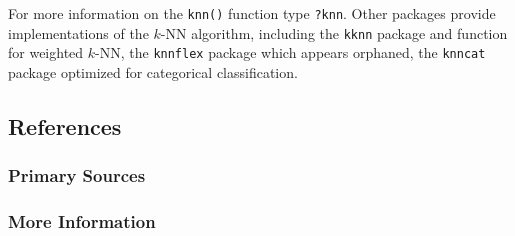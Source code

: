 For more information on the \texttt{knn()} function type \texttt{?knn}.
Other packages provide implementations of the $k$-NN algorithm, including the \texttt{kknn} package and function for weighted $k$-NN, the \texttt{knnflex} package which appears orphaned, the \texttt{knncat} package optimized for categorical classification.

\subsection{References}

\subsubsection{Primary Sources}



\subsubsection{More Information}





